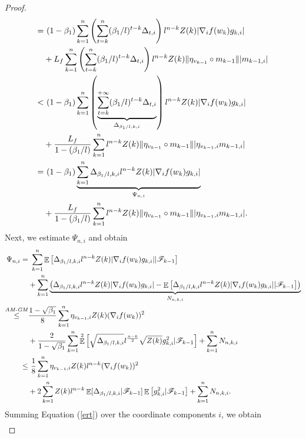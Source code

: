 \documentclass{article} %
\DeclareMathOperator{\Expect}{\mathbb{E}}
\begin{document}
\begin{proof}
\begin{align}
=&\ (1-\beta_{1})\sum_{k=1}^{n}\left(\sum_{t=k}^{n}(\beta_{1}/l)^{t-k}\Delta_{t,i}\right)l^{n-k} Z(k)|\nabla_{i} f(w_{k})g_{k,i}|\notag\\&+L_{f}\sum_{k=1}^{n}\left(\sum_{t=k}^{n}(\beta_{1}/l)^{t-k}\Delta_{t,i}\right)l^{n-k}Z(k)\|\eta_{v_{k-1}}\circ m_{k-1}\||m_{k-1,i}|\notag\\
<&\ (1-\beta_{1})\sum_{k=1}^{n}\left(\underbrace{\sum_{t=k}^{+\infty}(\beta_{1}/l)^{t-k}\Delta_{t,i}}_{\Delta_{\beta_{1}/l,k,i}}\right)l^{n-k} Z(k)|\nabla_{i} f(w_{k})g_{k,i}|\notag\\&+\frac{L_{f}}{1-(\beta_{1}/l)}\sum_{k=1}^{n}l^{n-k}Z(k)\|\eta_{v_{k-1}}\circ m_{k-1}\||\eta_{v_{k-1},i}m_{k-1,i}|\notag\\
=&\ (1-\beta_{1})\underbrace{\sum_{k=1}^{n}\Delta_{\beta_{1}/l,k,i}l^{n-k} Z(k)|\nabla_{i} f(w_{k})g_{k,i}|}_{\Psi_{n,i}}\notag\\&+\frac{L_{f}}{1-(\beta_{1}/l)}\sum_{k=1}^{n}l^{n-k}Z(k)\|\eta_{v_{k-1}}\circ m_{k-1}\||\eta_{v_{k-1},i}m_{k-1,i}|.   
\end{align}
Next, we estimate \(\Psi_{n,i}\) and obtain
\begin{align}\label{adam_0_0}
\Psi_{n,i}=&\ \sum_{k=1}^{n}\Expect\left[\Delta_{\beta_{1}/l,k,i}l^{n-k} Z(k)|\nabla_{i} f(w_{k})g_{k,i}||\mathscr{F}_{k-1}\right]\notag\\&+\sum_{k=1}^{n}\underbrace{\left(\Delta_{\beta_{1}/l,k,i}l^{n-k} Z(k)|\nabla_{i} f(w_{k})g_{k,i}|-\Expect\left[\Delta_{\beta_{1}/l,k,i}l^{n-k} Z(k)|\nabla_{i} f(w_{k})g_{k,i}||\mathscr{F}_{k-1}\right]\right)}_{N_{n,k,i}}\notag\\\mathop{\le}^{\text{\emph{AM-GM}}}& \frac{1-\sqrt{\beta_{1}}}{8}\sum_{k=1}^{n}\eta_{v_{k-1},i}Z(k)(\nabla_{i}f(w_{k}))^{2}\\&+\frac{2}{1-\sqrt{\beta_{1}}}\sum_{k=1}^{n}\Expect^{2}\left[\sqrt{\Delta_{\beta_{1}/l,k,i}}l^{\frac{n-k}{2}}\sqrt{Z(k)}g^{2}_{k,i}|\mathscr{F}_{k-1}\right]+\sum_{k=1}^{n}N_{n,k,i}\notag\\
\le&\ \frac{1}{8}\sum_{k=1}^{n}\eta_{v_{k-1},i}Z(k)l^{n-k}(\nabla_{i}f(w_{k}))^{2}\notag\\&+2\sum_{k=1}^{n}Z(k)l^{n-k}\Expect[\Delta_{\beta_{1}/l,k,i}|\mathscr{F}_{k-1}]\Expect\left[g^{2}_{k,i}|\mathscr{F}_{k-1}\right]+\sum_{k=1}^{n}N_{n,k,i}.
\end{align}
Summing Equation (\ref{ert}) over the coordinate components \(i\), we obtain
\begin{align}\label{adam_0_2}

\end{align}
\end{proof}
\end{document}
